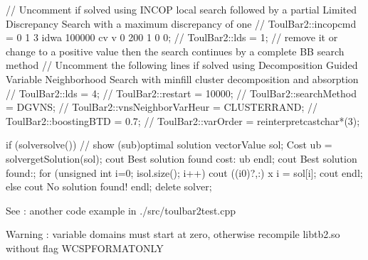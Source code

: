 \documentclass[letterpaper,10pt,openany,oneside,english]{sphinxmanual}
\begin{document}
\begin{fulllineitems}
\begin{sphinxVerbatim}[commandchars=\\\{\}]
    // Uncomment if solved using INCOP local search followed by a partial Limited Discrepancy Search with a maximum discrepancy of one
    //  ToulBar2::incop\PYGZus{}cmd = \PYGZdq{}0 1 3 idwa 100000 cv v 0 200 1 0 0\PYGZdq{};
    //  ToulBar2::lds = \PYGZhy{}1;  // remove it or change to a positive value then the search continues by a complete B\PYGZam{}B search method
    // Uncomment the following lines if solved using Decomposition Guided Variable Neighborhood Search with min\PYGZhy{}fill cluster decomposition and absorption
    // ToulBar2::lds = 4;
    // ToulBar2::restart = 10000;
    // ToulBar2::searchMethod = DGVNS;
    // ToulBar2::vnsNeighborVarHeur = CLUSTERRAND;
    // ToulBar2::boostingBTD = 0.7;
    // ToulBar2::varOrder = reinterpret\PYGZus{}cast\PYGZlt{}char*\PYGZgt{}(\PYGZhy{}3);

    if (solver\PYGZhy{}\PYGZgt{}solve()) \PYGZob{}
        // show (sub\PYGZhy{})optimal solution
        vector\PYGZlt{}Value\PYGZgt{} sol;
        Cost ub = solver\PYGZhy{}\PYGZgt{}getSolution(sol);
        cout \PYGZlt{}\PYGZlt{} \PYGZdq{}Best solution found cost: \PYGZdq{} \PYGZlt{}\PYGZlt{} ub \PYGZlt{}\PYGZlt{} endl;
        cout \PYGZlt{}\PYGZlt{} \PYGZdq{}Best solution found:\PYGZdq{};
        for (unsigned int i=0; i\PYGZlt{}sol.size(); i++) cout \PYGZlt{}\PYGZlt{} ((i\PYGZgt{}0)?\PYGZdq{},\PYGZdq{}:\PYGZdq{}\PYGZdq{}) \PYGZlt{}\PYGZlt{} \PYGZdq{} x\PYGZdq{} \PYGZlt{}\PYGZlt{} i \PYGZlt{}\PYGZlt{} \PYGZdq{} = \PYGZdq{} \PYGZlt{}\PYGZlt{} sol[i];
        cout \PYGZlt{}\PYGZlt{} endl;
    \PYGZcb{} else \PYGZob{}
        cout \PYGZlt{}\PYGZlt{} \PYGZdq{}No solution found!\PYGZdq{} \PYGZlt{}\PYGZlt{} endl;
    \PYGZcb{}
    delete solver;
\PYGZcb{}
\end{sphinxVerbatim}


\sphinxAtStartPar
See : another code example in ./src/toulbar2test.cpp

\sphinxAtStartPar
Warning : variable domains must start at zero, otherwise recompile libtb2.so without flag WCSPFORMATONLY 

\end{fulllineitems}
\end{document}
